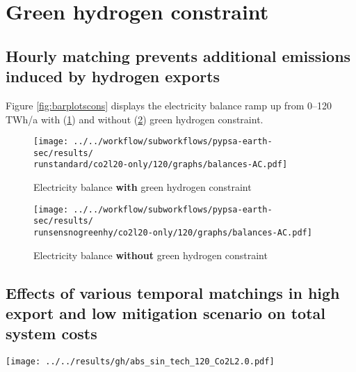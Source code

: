 \section{Green hydrogen constraint}
\label{subsec:gh_constraint_effects}

\subsection{Hourly matching prevents additional emissions induced by hydrogen exports}
Figure \ref{fig:barplotscons} displays the electricity balance ramp up from 0--120 TWh/a with (\ref{fig:balances_AC_monthlymatch}) and without (\ref{fig:balances_AC_nogreen}) green hydrogen constraint.

\begin{figure*}[h!]
    \centering
    \begin{subfigure}[b]{0.49\linewidth}
        \centering
        \texttt{[image: ../../workflow/subworkflows/pypsa-earth-sec/results/\\runstandard/co2l20-only/120/graphs/balances-AC.pdf]}
        \caption{Electricity balance {\bf with} green hydrogen constraint}
        \label{fig:balances_AC_monthlymatch}
    \end{subfigure}
    \hfill
    \begin{subfigure}[b]{0.49\linewidth}
        \centering
        \texttt{[image: ../../workflow/subworkflows/pypsa-earth-sec/results/\\runsensnogreenhy/co2l20-only/120/graphs/balances-AC.pdf]}
        \caption{Electricity balance {\bf without} green hydrogen constraint}
        \label{fig:balances_AC_nogreen}
    \end{subfigure}
    \hfill
    \caption{Electricity balance ramp up from 0--120 TWh/a with (\ref{fig:balances_AC_monthlymatch}) and without (\ref{fig:balances_AC_nogreen}) green hydrogen constraint}
    \label{fig:barplotscons}
\end{figure*}


\subsection{Effects of various temporal matchings in high export and low mitigation scenario on total system costs}

\begin{figure*}[h]
    \centering
    \texttt{[image: ../../results/gh/abs\_sin\_tech\_120\_Co2L2.0.pdf]}
    \caption{Total system costs at 120 TWh/a export and 0\% domestic mitigation. Stricter hydrogen regulation mainly increases the total CAPEX of additional solar PV, electrolysis and hydrogen storage. In return, the OPEX of fossil generation (mainly gas), decreases. The large share of oil OPEX is independent of hydrogen regulation, since these costs are mainly linked to combustion engine cars with demands independent of hydrogen regulation.}
    \label{fig:tsc-120-0}
\end{figure*}




